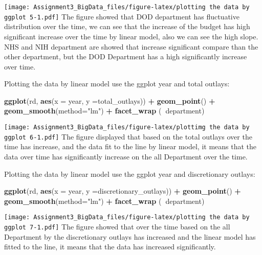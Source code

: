 \documentclass[]{article}
\newenvironment{Shaded}{\begin{snugshade}}{\end{snugshade}}
\newcommand{\KeywordTok}[1]{\textcolor[rgb]{0.13,0.29,0.53}{\textbf{#1}}}
\newcommand{\DataTypeTok}[1]{\textcolor[rgb]{0.13,0.29,0.53}{#1}}
\newcommand{\StringTok}[1]{\textcolor[rgb]{0.31,0.60,0.02}{#1}}
\newcommand{\OperatorTok}[1]{\textcolor[rgb]{0.81,0.36,0.00}{\textbf{#1}}}
\newcommand{\NormalTok}[1]{#1}
\begin{document}
\texttt{[image: Assignment3\_BigData\_files/figure-latex/plotting the data by ggplot 5-1.pdf]}
The figure showed that DOD department has fluctuative distribution over
the time, we can see that the increase of the budget has high
significant increase over the time by linear model, also we can see the
high slope. NHS and NIH department are showed that increase significant
compare than the other department, but the DOD Department has a high
significantly increase over time.

Plotting the data by linear model use the ggplot year and total outlays:

\begin{Shaded}
\begin{Highlighting}[]
\KeywordTok{ggplot}\NormalTok{(rd, }\KeywordTok{aes}\NormalTok{(}\DataTypeTok{x =}\NormalTok{ year, }\DataTypeTok{y =}\NormalTok{total_outlays)) }\OperatorTok{+}
\StringTok{  }\KeywordTok{geom_point}\NormalTok{() }\OperatorTok{+}\StringTok{ }\KeywordTok{geom_smooth}\NormalTok{(}\DataTypeTok{method=}\StringTok{"lm"}\NormalTok{) }\OperatorTok{+}\StringTok{ }\KeywordTok{facet_wrap}\NormalTok{ (}\OperatorTok{~}\NormalTok{department)}
\end{Highlighting}
\end{Shaded}

\texttt{[image: Assignment3\_BigData\_files/figure-latex/plottimg the data by ggplot 6-1.pdf]}
The figure displayed that based on the total outlays over the time has
increase, and the data fit to the line by linear model, it means that
the data over time has significantly increase on the all Department over
the time.

Plotting the data by linear model use the ggplot year and discretionary
outlays:

\begin{Shaded}
\begin{Highlighting}[]
\KeywordTok{ggplot}\NormalTok{(rd, }\KeywordTok{aes}\NormalTok{(}\DataTypeTok{x =}\NormalTok{ year, }\DataTypeTok{y =}\NormalTok{discretionary_outlays)) }\OperatorTok{+}
\StringTok{  }\KeywordTok{geom_point}\NormalTok{() }\OperatorTok{+}\StringTok{ }\KeywordTok{geom_smooth}\NormalTok{(}\DataTypeTok{method=}\StringTok{"lm"}\NormalTok{) }\OperatorTok{+}\StringTok{ }\KeywordTok{facet_wrap}\NormalTok{ (}\OperatorTok{~}\NormalTok{department)}
\end{Highlighting}
\end{Shaded}

\texttt{[image: Assignment3\_BigData\_files/figure-latex/plotting the data by ggplot 7-1.pdf]}
The figure showed that over the time based on the all Department by the
discretionary outlays has increased and the linear model has fitted to
the line, it means that the data has increased significantly.
\end{document}
